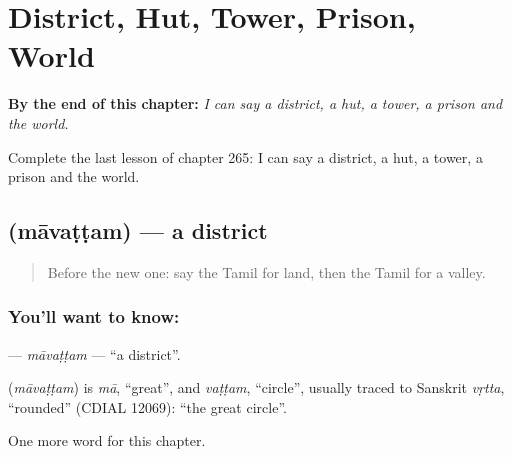
\chapter{District, Hut, Tower, Prison, World}
\label{ch:ta-district-hut-tower-prison-world}

\begin{chapteropening}
\textbf{By the end of this chapter:} \emph{I can say a district, a hut, a tower, a prison and the world.}

Complete the last lesson of chapter 265: I can say a district, a hut, a tower, a prison and the world.
\end{chapteropening}

\section[\texorpdfstring{\ta{மாவட்டம்} (māvaṭṭam)}{மாவட்டம் (māvaṭṭam)}]{ (māvaṭṭam) — a district}

\label{lesson:TA-C265-mavattam}



\begin{quote}
Before the new one: say the Tamil for land, then the Tamil for a valley.
\end{quote}

\subsection*{You'll want to know: }
\textbf{} — \emph{māvaṭṭam} — \textquotedblleft{}a district\textquotedblright{}.

\begin{cousinweb}
\textbf{} (\emph{māvaṭṭam}) is \emph{mā}, \textquotedblleft{}great\textquotedblright{}, and \emph{vaṭṭam}, \textquotedblleft{}circle\textquotedblright{}, usually traced to Sanskrit \emph{vṛtta}, \textquotedblleft{}rounded\textquotedblright{} (CDIAL 12069): \textquotedblleft{}the great circle\textquotedblright{}.
\end{cousinweb}

\begin{grammarlens}[title={What you've built}]
One more word for this chapter.
\end{grammarlens}

